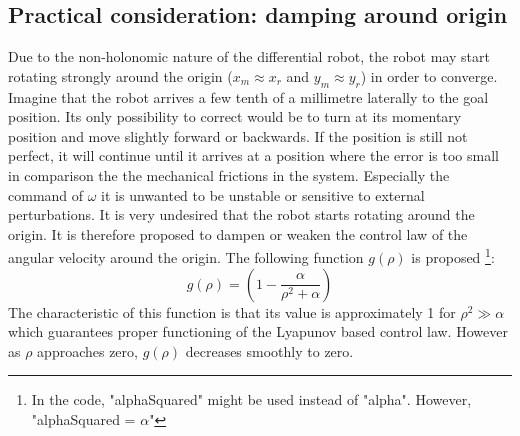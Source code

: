 \documentclass[a4paper, 11pt]{article}
\begin{document}
\subsection{Practical consideration: damping around origin}
Due to the non-holonomic nature of the differential robot, the robot may start rotating strongly around the origin ($x_m \approx x_r$ and $y_m \approx y_r$) in order to converge. Imagine that the robot arrives a few tenth of a millimetre laterally to the goal position. Its only possibility to correct would be to turn at its momentary position and move slightly forward or backwards. If the position is still not perfect, it will continue until it arrives at a position where the error is too small in comparison the the mechanical frictions in the system. Especially the command of $\omega$ it is unwanted to be unstable or sensitive to external perturbations. It is very undesired that the robot starts rotating around the origin. It is therefore proposed to dampen or weaken the control law of the angular velocity around the origin. The following function $g(\rho)$ is proposed \footnote{In the code, "alphaSquared" might be used instead of "alpha". However, "alphaSquared = $\alpha$"}:
\begin{equation}
g(\rho) = \left(1- \frac{\alpha}{\rho^2 +\alpha}\right)
\end{equation}
The characteristic of this function is that its value is approximately 1 for $\rho^2 \gg \alpha $ which guarantees proper functioning of the Lyapunov based control law. However as $\rho$ approaches zero, $g(\rho)$ decreases smoothly to zero.
\begin{figure}[H]
	\centering
\end{figure}
\end{document}
